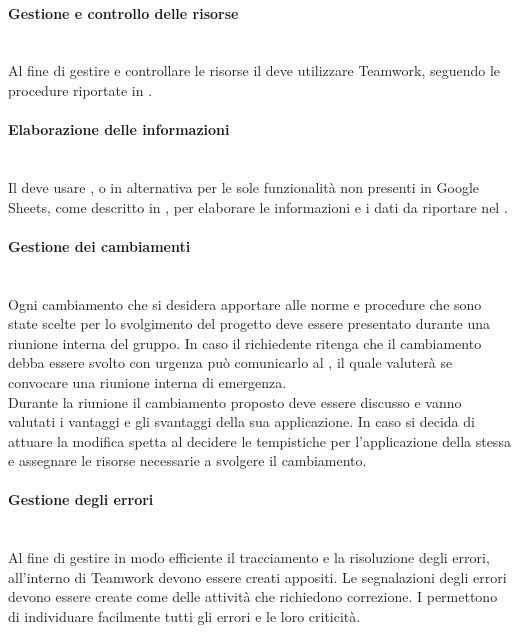 \paragraph{Gestione e controllo delle risorse}\mbox{}\\
Al fine di gestire e controllare le risorse il \Responsabile{} deve utilizzare Teamwork, seguendo le procedure riportate in .

\paragraph{Elaborazione delle informazioni}\mbox{}\\
Il \Responsabile{} deve usare , o in alternativa  per le sole funzionalità non presenti in Google Sheets, come descritto in , per elaborare le informazioni e i dati da riportare nel \PianoDiProgetto.

\paragraph{Gestione dei cambiamenti}\mbox{}\\
Ogni cambiamento che si desidera apportare alle norme e procedure che sono state scelte per lo svolgimento del progetto deve essere presentato durante una riunione interna del gruppo. In caso il richiedente ritenga che il cambiamento debba essere svolto con urgenza può comunicarlo al \Responsabile{}, il quale valuterà se convocare una riunione interna di emergenza.
\\Durante la riunione il cambiamento proposto deve essere discusso e vanno valutati i vantaggi e gli svantaggi della sua applicazione. In caso si decida di attuare la modifica spetta al \Responsabile{} decidere le tempistiche per l'applicazione della stessa e assegnare le risorse necessarie a svolgere il cambiamento.

\paragraph{Gestione degli errori} \mbox{} \\
Al fine di gestire in modo efficiente il tracciamento e la risoluzione degli errori, all'interno di Teamwork devono essere creati  appositi.
Le segnalazioni degli errori devono essere create come  delle attività che richiedono correzione. I  permettono di individuare facilmente tutti gli errori e le loro criticità.\\

